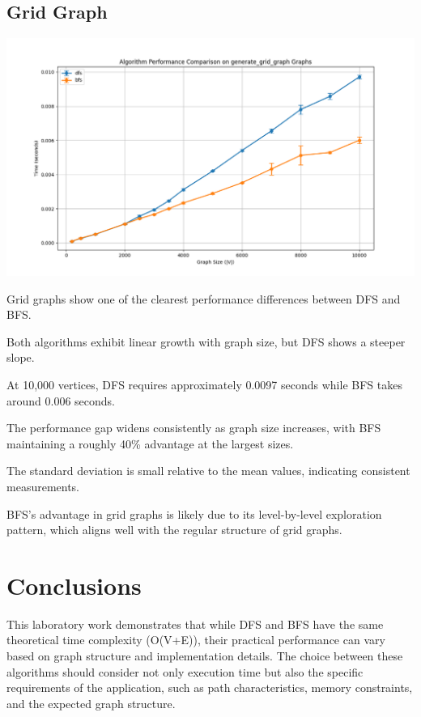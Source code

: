 \documentclass[a4paper,12pt]{article}
\begin{document}
\subsection{Grid Graph}
\label{sec:orgf7c8b82}
\begin{center}
\includegraphics[width=.9\linewidth]{dfs_grid.png}
\label{org5b59c1c}
\end{center}

Grid graphs show one of the clearest performance differences between DFS and BFS.

Both algorithms exhibit linear growth with graph size, but DFS shows a steeper slope.

At 10,000 vertices, DFS requires approximately 0.0097 seconds while BFS takes around 0.006 seconds.

The performance gap widens consistently as graph size increases, with BFS maintaining a roughly 40\% advantage at the largest sizes.

The standard deviation is small relative to the mean values, indicating consistent measurements.

BFS's advantage in grid graphs is likely due to its level-by-level exploration pattern, which aligns well with the regular structure of grid graphs.
\section{Conclusions}
\label{sec:org35dbe9c}

This laboratory work demonstrates that while DFS and BFS have the same theoretical time complexity (O(V+E)), their practical performance can vary based on graph structure and implementation details. The choice between these algorithms should consider not only execution time but also the specific requirements of the application, such as path characteristics, memory constraints, and the expected graph structure.
\end{document}
